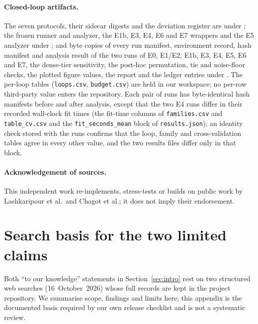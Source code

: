 \documentclass[11pt,a4paper]{article}
\begin{document}
\paragraph{Closed-loop artifacts.} The seven protocols, their sidecar digests
and the deviation register are under ; the frozen
runner and analyzer, the E1b, E3, E4, E6 and E7 wrappers and the E5 analyzer under
; and byte copies of every run manifest, environment record,
hash manifest and analysis result of the two runs of E0, E1/E2, E1b, E3, E4, E5,
E6 and E7, the dense-tier sensitivity, the post-hoc permutation, tie and
noise-floor checks, the plotted figure values, the report and the ledger
entries under . The per-loop tables (\texttt{loops.csv},
\texttt{budget.csv}) are held in our workspace; no per-row third-party value
enters the repository. Each pair of runs has byte-identical hash manifests
before and after analysis, except that the two E4 runs differ in their recorded
wall-clock fit times (the fit-time columns of \texttt{families.csv} and
\texttt{table\_cv.csv} and the \texttt{fit\_seconds\_mean} block of
\texttt{results.json}); an identity check stored with the runs confirms that the
loop, family and cross-validation tables agree in every other value, and the two
results files differ only in that block.

\paragraph{Acknowledgement of sources.} This independent work re-implements,
stress-tests or builds on public work by Lashkaripour et al.\ and Chagot et
al.; it does not imply their endorsement.




\appendix

\section{Search basis for the two limited claims}
\label{app:search}
Both ``to our knowledge'' statements in Section~\ref{sec:intro} rest on two
structured web searches (16~October~2026) whose full records are kept in the
project repository. We summarise scope, findings and
limits here; this appendix is the documented basis required by our own release
checklist and is not a systematic review.
\end{document}
